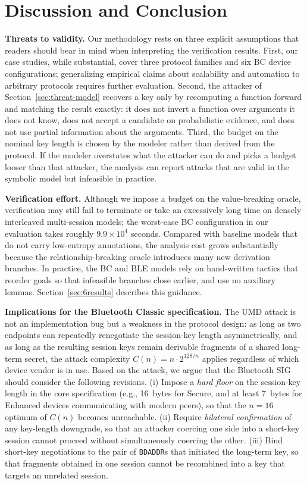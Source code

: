 \section{Discussion and Conclusion} \label{sec:8discussion-conclusion}

\noindent\textbf{Threats to validity.}
Our methodology rests on three explicit assumptions that readers should bear in mind when
interpreting the verification results.
First, our case studies, while substantial, cover three protocol families and six BC device
configurations; generalizing empirical claims about scalability and automation to arbitrary
protocols requires further evaluation.
Second, the attacker of Section~\ref{sec:threat-model} recovers a key only by recomputing a
function forward and matching the result exactly: it does not invert a function over arguments it
does not know, does not accept a candidate on probabilistic evidence, and does not use partial
information about the arguments.
Third, the budget on the nominal key length is chosen by the modeler rather than derived from the
protocol.
If the modeler overstates what the attacker can do and picks a budget looser than that attacker,
the analysis can report attacks that are valid in the symbolic model but infeasible in practice.

\noindent\textbf{Verification effort.}
Although we impose a budget on the value-breaking oracle, verification may still fail to terminate or take an excessively long time on densely interleaved multi-session models; the worst-case BC configuration in our evaluation takes roughly $9.9 \times 10^4$ seconds.
Compared with baseline models that do not carry low-entropy annotations, the analysis cost grows substantially because the relationship-breaking oracle introduces many new derivation branches.
In practice, the BC and BLE models rely on hand-written \Tamarin{} tactics that reorder goals so
that infeasible branches close earlier, and use no auxiliary lemmas. Section~\ref{sec:6results}
describes this guidance.

\noindent\textbf{Implications for the Bluetooth Classic specification.}
The UMD attack is not an implementation bug but a weakness in the protocol design: as long as two endpoints can repeatedly renegotiate the session-key length asymmetrically, and as long as the resulting session keys remain derivable fragments of a shared long-term secret, the attack complexity $C(n) = n \cdot 2^{128/n}$ applies regardless of which device vendor is in use.
Based on the attack, we argue that the Bluetooth SIG should consider the following revisions.
(i) Impose a \emph{hard floor} on the session-key length in the core specification (e.g., 16~bytes for Secure, and at least 7~bytes for Enhanced devices communicating with modern peers), so that the $n = 16$ optimum of $C(n)$ becomes unreachable.
(ii) Require \emph{bilateral confirmation} of any key-length downgrade, so that an attacker coercing one side into a short-key session cannot proceed without simultaneously coercing the other.
(iii) Bind short-key negotiations to the pair of \texttt{BDADDR}s that initiated the long-term key, so that fragments obtained in one session cannot be recombined into a key that targets an unrelated session.

